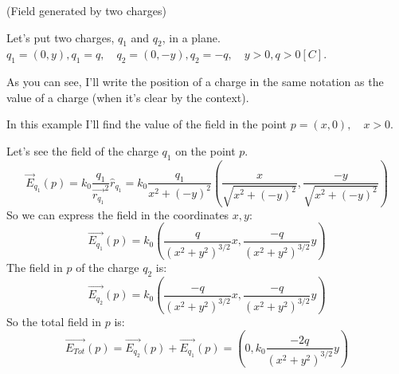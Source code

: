 \documentclass{article}
\begin{document}
\newpage{}
\begin{xpl}{(Field generated by two charges)}

  Let's put two charges, $q_1$ and $q_2$, in a plane. \\ 
  $q_1 = (0, y), q_1 = q, \quad q_2 = (0, -y), q_2 = -q, \quad y>0, q>0 [C]$.

  As you can see, I'll write the position of a charge in the same notation as the value of a charge (when it's clear by the context).
  
  In this example I'll find the value of the field in the point $p=(x,0), \quad x>0.$

  Let's see the field of the charge $q_1$ on the point $p$.  
  $$\vec{E}_{q_1}(p)=k_0 \frac{q_1}{\overrightarrow{r_{q_1}}^2}\hat{r}_{q_1} = 
  k_0\frac{q_1}{{x^2 +(-y)^2}}(\frac{x}{\sqrt{x^2+(-y)^2}},\frac{-y}{\sqrt{x^2+(-y)^2}}) $$
  So we can express the field in the coordinates $x,y$: 
  $$ \overrightarrow{E_{q_1}}(p) = k_0 (\frac{q}{(x^2 + y^2)^{3/2}}x,\frac{-q}{(x^2 + y^2)^{3/2}}y) $$
  The field in $p$ of the charge $q_2$ is:
  $$ \overrightarrow{E_{q_2}}(p) = k_0 (\frac{-q}{(x^2 + y^2)^{3/2}}x,\frac{-q}{(x^2 + y^2)^{3/2}}y) $$
  So the total field in $p$ is: 
  $$ \overrightarrow{E_{Tot}}(p) = \overrightarrow{E_{q_2}}(p) + \overrightarrow{E_{q_1}}(p) 
  = (0,k_0\frac{-2q}{(x^2 + y^2)^{3/2}}y) $$
\end{xpl}
\newpage{}  
\end{document}
